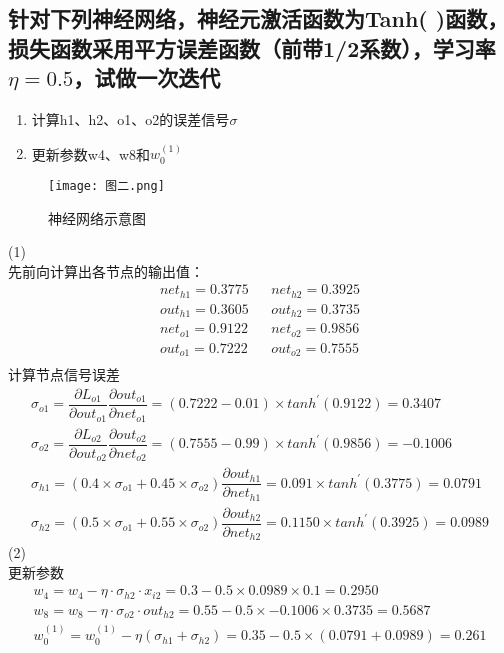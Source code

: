 \documentclass{ctexart}
\begin{document}
\subsection*{针对下列神经网络，神经元激活函数为Tanh( )函数，损失函数采用平方误差函数（前带1/2系数），学习率$\eta=0.5$，试做一次迭代}

\begin{enumerate}[(1)]
\item 计算h1、h2、o1、o2的误差信号$\sigma$
\item 更新参数w4、w8和$w_0^{(1)}$
\end{enumerate}

\begin{figure}[H]
\centerline{\texttt{[image: 图二.png]}}
\caption{神经网络示意图}
\end{figure}

(1)\\
先前向计算出各节点的输出值：
\begin{align*}
net_{h1}=0.3775&&net_{h2}=0.3925\\
out_{h1}=0.3605&&out_{h2}=0.3735\\
net_{o1}=0.9122&&net_{o2}=0.9856\\
out_{o1}=0.7222&&out_{o2}=0.7555\\
\end{align*}
计算节点信号误差
\begin{gather*}
\sigma_{o1}=\dfrac{\partial L_{o1}}{\partial out_{o1}}\dfrac{\partial out_{o1}}{\partial net_{o1}}=(0.7222-0.01)\times tanh^{'}(0.9122)=0.3407\\
\sigma_{o2}=\dfrac{\partial L_{o2}}{\partial out_{o2}}\dfrac{\partial out_{o2}}{\partial net_{o2}}=(0.7555-0.99)\times tanh^{'}(0.9856)=-0.1006\\
\sigma_{h1}=(0.4\times\sigma_{o1}+0.45\times\sigma_{o2})\dfrac{\partial out_{h1}}{\partial net_{h1}}=0.091\times tanh^{'}(0.3775)=0.0791\\
\sigma_{h2}=(0.5\times\sigma_{o1}+0.55\times\sigma_{o2})\dfrac{\partial out_{h2}}{\partial net_{h2}}=0.1150\times tanh^{'}(0.3925)=0.0989
\end{gather*}
(2)\\
更新参数\\
\begin{gather*}
w_4=w_4-\eta\cdot \sigma_{h2} \cdot x_{i2}=0.3-0.5\times0.0989\times0.1=0.2950\\
w_8=w_8-\eta\cdot \sigma_{o2} \cdot out_{h2}=0.55-0.5\times-0.1006\times0.3735=0.5687\\
w_0^{(1)}=w_0^{(1)}-\eta(\sigma_{h1}+\sigma_{h2})=0.35-0.5\times(0.0791+0.0989)= 0.261
\end{gather*}
\end{document}
